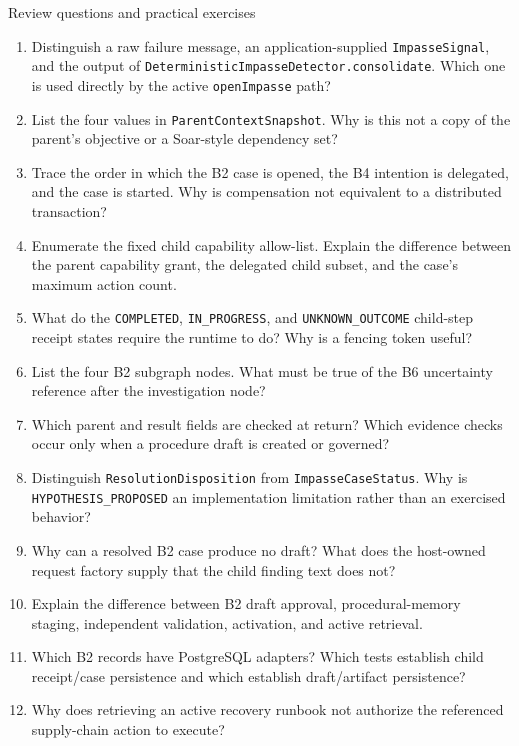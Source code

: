 \begin{reviewquestions}{Review questions and practical exercises}
\begin{enumerate}
  \item Distinguish a raw failure message, an application-supplied \texttt{ImpasseSignal}, and the output of \texttt{Deterministic\allowbreak Impasse\allowbreak Detector.\allowbreak consolidate}. Which one is used directly by the active \texttt{openImpasse} path?
  \item List the four values in \texttt{Parent\allowbreak Context\allowbreak Snapshot}. Why is this not a copy of the parent's objective or a Soar-style dependency set?
  \item Trace the order in which the B2 case is opened, the B4 intention is delegated, and the case is started. Why is compensation not equivalent to a distributed transaction?
  \item Enumerate the fixed child capability allow-list. Explain the difference between the parent capability grant, the delegated child subset, and the case's maximum action count.
  \item What do the \texttt{COMPLETED}, \texttt{IN\_PROGRESS}, and \texttt{UNKNOWN\_\allowbreak OUTCOME} child-step receipt states require the runtime to do? Why is a fencing token useful?
  \item List the four B2 subgraph nodes. What must be true of the B6 uncertainty reference after the investigation node?
  \item Which parent and result fields are checked at return? Which evidence checks occur only when a procedure draft is created or governed?
  \item Distinguish \texttt{Resolution\allowbreak Disposition} from \texttt{Impasse\allowbreak Case\allowbreak Status}. Why is \texttt{HYPOTHESIS\_\allowbreak PROPOSED} an implementation limitation rather than an exercised behavior?
  \item Why can a resolved B2 case produce no draft? What does the host-owned request factory supply that the child finding text does not?
  \item Explain the difference between B2 draft approval, procedural-memory staging, independent validation, activation, and active retrieval.
  \item Which B2 records have PostgreSQL adapters? Which tests establish child receipt/case persistence and which establish draft/artifact persistence?
  \item Why does retrieving an active recovery runbook not authorize the referenced supply-chain action to execute?
\end{enumerate}


\end{reviewquestions}
